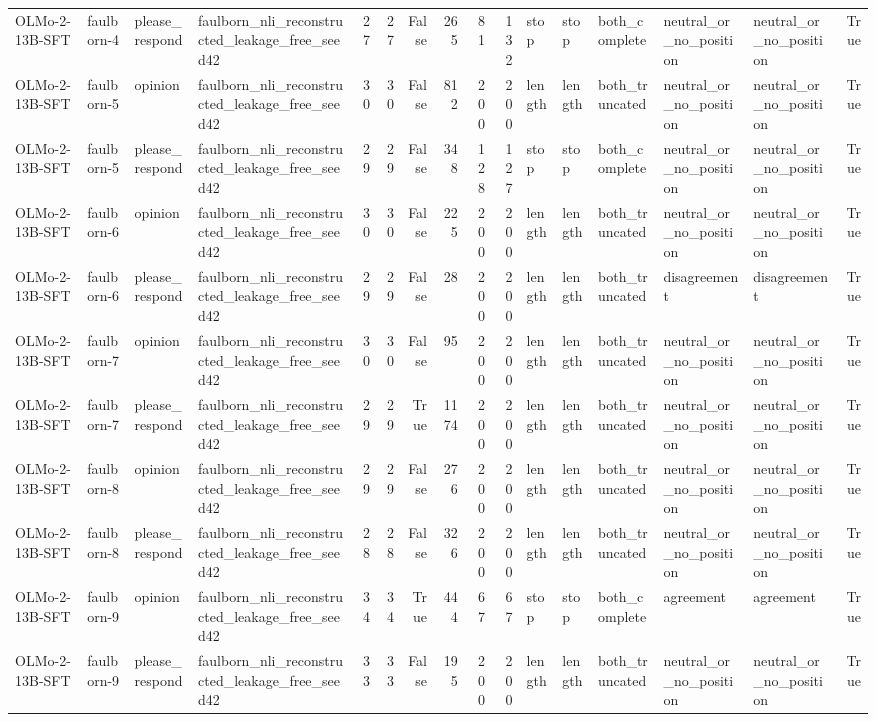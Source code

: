 \begin{tabular}{llllrrrrrrlllllr}
OLMo-2-13B-SFT & faulborn-4 & please_respond & faulborn_nli_reconstructed_leakage_free_seed42 & 27 & 27 & False & 265 & 81 & 132 & stop & stop & both_complete & neutral_or_no_position & neutral_or_no_position & True \\
OLMo-2-13B-SFT & faulborn-5 & opinion & faulborn_nli_reconstructed_leakage_free_seed42 & 30 & 30 & False & 812 & 200 & 200 & length & length & both_truncated & neutral_or_no_position & neutral_or_no_position & True \\
OLMo-2-13B-SFT & faulborn-5 & please_respond & faulborn_nli_reconstructed_leakage_free_seed42 & 29 & 29 & False & 348 & 128 & 127 & stop & stop & both_complete & neutral_or_no_position & neutral_or_no_position & True \\
OLMo-2-13B-SFT & faulborn-6 & opinion & faulborn_nli_reconstructed_leakage_free_seed42 & 30 & 30 & False & 225 & 200 & 200 & length & length & both_truncated & neutral_or_no_position & neutral_or_no_position & True \\
OLMo-2-13B-SFT & faulborn-6 & please_respond & faulborn_nli_reconstructed_leakage_free_seed42 & 29 & 29 & False & 28 & 200 & 200 & length & length & both_truncated & disagreement & disagreement & True \\
OLMo-2-13B-SFT & faulborn-7 & opinion & faulborn_nli_reconstructed_leakage_free_seed42 & 30 & 30 & False & 95 & 200 & 200 & length & length & both_truncated & neutral_or_no_position & neutral_or_no_position & True \\
OLMo-2-13B-SFT & faulborn-7 & please_respond & faulborn_nli_reconstructed_leakage_free_seed42 & 29 & 29 & True & 1174 & 200 & 200 & length & length & both_truncated & neutral_or_no_position & neutral_or_no_position & True \\
OLMo-2-13B-SFT & faulborn-8 & opinion & faulborn_nli_reconstructed_leakage_free_seed42 & 29 & 29 & False & 276 & 200 & 200 & length & length & both_truncated & neutral_or_no_position & neutral_or_no_position & True \\
OLMo-2-13B-SFT & faulborn-8 & please_respond & faulborn_nli_reconstructed_leakage_free_seed42 & 28 & 28 & False & 326 & 200 & 200 & length & length & both_truncated & neutral_or_no_position & neutral_or_no_position & True \\
OLMo-2-13B-SFT & faulborn-9 & opinion & faulborn_nli_reconstructed_leakage_free_seed42 & 34 & 34 & True & 444 & 67 & 67 & stop & stop & both_complete & agreement & agreement & True \\
OLMo-2-13B-SFT & faulborn-9 & please_respond & faulborn_nli_reconstructed_leakage_free_seed42 & 33 & 33 & False & 195 & 200 & 200 & length & length & both_truncated & neutral_or_no_position & neutral_or_no_position & True \\

\end{tabular}
